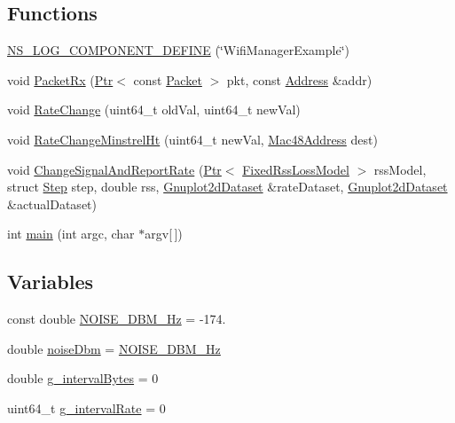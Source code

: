 \subsection*{Functions}
\begin{DoxyCompactItemize}
\item 
\hyperlink{wifi-manager-example_8cc_a148be26ed75a55a0293248eba33f8193}{N\+S\+\_\+\+L\+O\+G\+\_\+\+C\+O\+M\+P\+O\+N\+E\+N\+T\+\_\+\+D\+E\+F\+I\+NE} (\char`\"{}Wifi\+Manager\+Example\char`\"{})
\item 
void \hyperlink{wifi-manager-example_8cc_a58be0453724cdae9cedb709d670d66c6}{Packet\+Rx} (\hyperlink{classns3_1_1Ptr}{Ptr}$<$ const \hyperlink{classns3_1_1Packet}{Packet} $>$ pkt, const \hyperlink{classns3_1_1Address}{Address} \&addr)
\item 
void \hyperlink{wifi-manager-example_8cc_a480632f18145ef95c5adaac058fc88ce}{Rate\+Change} (uint64\+\_\+t old\+Val, uint64\+\_\+t new\+Val)
\item 
void \hyperlink{wifi-manager-example_8cc_a59051cedbe984ebc1d26de63538eeef6}{Rate\+Change\+Minstrel\+Ht} (uint64\+\_\+t new\+Val, \hyperlink{classns3_1_1Mac48Address}{Mac48\+Address} dest)
\item 
void \hyperlink{wifi-manager-example_8cc_adeb3e022073e20a0edcca5f97eec50d9}{Change\+Signal\+And\+Report\+Rate} (\hyperlink{classns3_1_1Ptr}{Ptr}$<$ \hyperlink{classns3_1_1FixedRssLossModel}{Fixed\+Rss\+Loss\+Model} $>$ rss\+Model, struct \hyperlink{structStep}{Step} step, double rss, \hyperlink{classns3_1_1Gnuplot2dDataset}{Gnuplot2d\+Dataset} \&rate\+Dataset, \hyperlink{classns3_1_1Gnuplot2dDataset}{Gnuplot2d\+Dataset} \&actual\+Dataset)
\item 
int \hyperlink{wifi-manager-example_8cc_a0ddf1224851353fc92bfbff6f499fa97}{main} (int argc, char $\ast$argv\mbox{[}$\,$\mbox{]})
\end{DoxyCompactItemize}
\subsection*{Variables}
\begin{DoxyCompactItemize}
\item 
const double \hyperlink{wifi-manager-example_8cc_a4c0854641eaf06479f9e825c840684d3}{N\+O\+I\+S\+E\+\_\+\+D\+B\+M\+\_\+\+Hz} = -\/174.
\item 
double \hyperlink{wifi-manager-example_8cc_af9f95286ad3d5d533ca9d9b455e70398}{noise\+Dbm} = \hyperlink{wifi-manager-example_8cc_a4c0854641eaf06479f9e825c840684d3}{N\+O\+I\+S\+E\+\_\+\+D\+B\+M\+\_\+\+Hz}
\item 
double \hyperlink{wifi-manager-example_8cc_a76477e4410026bd7e3460fcd9e3f3847}{g\+\_\+interval\+Bytes} = 0
\item 
uint64\+\_\+t \hyperlink{wifi-manager-example_8cc_a15352b730cb23450ffdf71ed0d8d0a7e}{g\+\_\+interval\+Rate} = 0
\end{DoxyCompactItemize}


